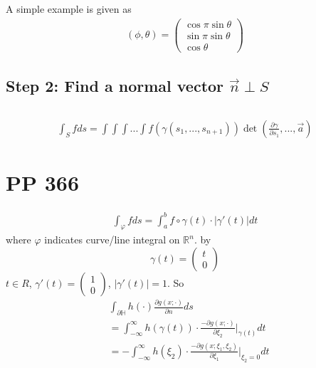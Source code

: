 \documentclass{article}
\numberwithin{equation}{section}
\newcommand{\<}{\langle}
\begin{document}
\begin{tcolorbox}[colback=blue!20!white]
A simple example is given as
\begin{align*}
(\phi, \theta) = \begin{pmatrix}
	\cos \pi \sin \theta\\
	\sin \pi \sin \theta\\
	\cos \theta
\end{pmatrix}
\end{align*}
\end{tcolorbox}
\subsection{Step 2: Find a normal vector $\vec{n}\perp S$}
\subsection{}
\begin{align*}
	\int_S f ds = \int \int \int ...\int f(\gamma(s_1,...,s_{n+1})) \det(\frac{\partial \gamma}{\partial s_1},...,\vec{a})
\end{align*}

\section{PP 366}
\begin{align*}
	\int_{\varphi} f ds = \int_a^b f \circ \gamma(t)\cdot  |\gamma'(t)|dt
\end{align*}
where $\varphi$ indicates curve/line integral on $\mathbb{R}^n$. by
\[
	\gamma (t) = \begin{pmatrix}
		t \\ 0
	\end{pmatrix}
\]
$t \in R$, $\gamma'(t) = \begin{pmatrix} 1\\0 \end{pmatrix}$, $|\gamma'(t) | = 1$.
So
\begin{align*}
	&\int_{\partial \mathbb{H}} h(\cdot ) \frac{\partial g(x;\cdot )}{\partial n} ds \\
	&= \int_{-\infty}^\infty h(\gamma(t))\cdot \frac{-\partial g(x;\cdot )}{\partial \xi_2}|_{\gamma(t)} dt \\
	&= - \int _{- \infty }^{\infty}h(\xi_2)\cdot \frac{-\partial g(x;\xi_1,\xi_2 )}{\partial \xi_1}|_{\xi_2 = 0} dt \\
\end{align*}
\end{document}
